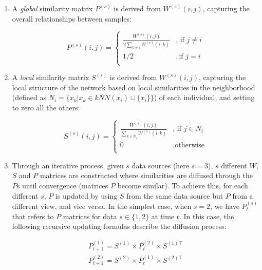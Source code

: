 \begin{itemize}[]
\begin{enumerate}[\IEEEsetlabelwidth{12)}]
        \item A \textit{global} similarity matrix $P^{(s)}$ is derived from $W^{(s)}(i,j)$, capturing the overall relationships between samples:

        \begin{equation}
        \label{eq:global_kernel}
            P^{(s)}(i,j) = 
                \begin{cases}
                \frac{W^{(s)}(i,j)}{2 \sum_{k \neq i} W^{(s)}(i,k)} & \text{, if $j \neq i$}\\
                1/2 & , \text{if $j = i$}\\
            \end{cases}
        \end{equation}
        
        \item A \textit{local} similarity matrix $S^{(s)}$ is derived from $W^{(s)}(i,j)$, capturing the local structure of the network based on local similarities in the neighborhood (defined as $N_i = \{ x_k | x_k \in kNN(x_i) \cup \{ x_i \}\}$) of each individual, and setting to zero all the others:

        \begin{equation}
        \label{eq:local_kernel}
            S^{(s)}(i,j) = 
            \begin{cases}
                \frac{W^{(s)}(i,j)}{\sum_{k \in N_i} W^{(s)}(i,k)} & \text{, if $j \in N_i$}\\
                0 & , \text{otherwise}\\
            \end{cases}
        \end{equation}        
        
        \item Through an iterative process, given $s$ data sources (here $s = 3$), $s$ different $W$, $S$ and $P$ matrices are constructed where similarities are diffused through the $P$s until convergence (matrices $P$ become similar). To achieve this, for each different $s$, $P$ is updated by using $S$ from the same data source but $P$ from a different view, and vice versa. In the simplest case, when $s=2$, we have $P_t^{(s)}$ that refers to $P$ matrices for data $s \in \{ 1,2\}$ at time $t$. In this case, the following recursive updating formulas describe the diffusion process:

        \begin{equation}
            \label{eq:update}
            \begin{aligned}
                P^{(1)}_{t+1}=S^{(1)} \times P^{(2)}_{t} \times S^{(1)\top} \\
                P^{(2)}_{t+1}=S^{(2)} \times P^{(1)}_{t} \times  S^{(2)\top}  
            \end{aligned}
        \end{equation}


\end{enumerate}
\end{itemize}
